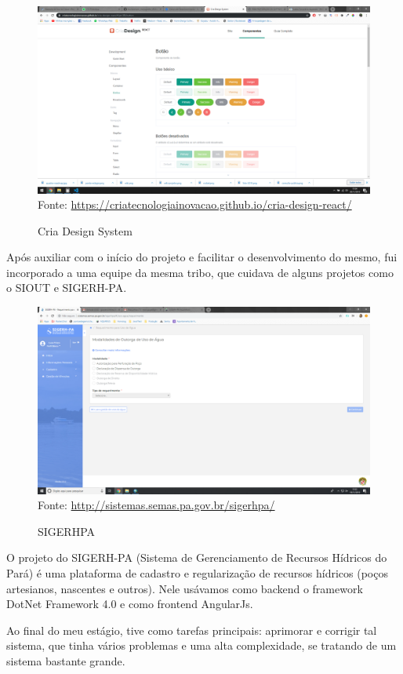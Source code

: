 \begin{figure}[H]
\centering
\caption{Cria Design System} %
\includegraphics[scale=0.3]{cria-design}\\  %
{\small Fonte: \url{https://criatecnologiainovacao.github.io/cria-design-react/}} %
\label{fig:exemplo} %
\end{figure}

Após auxiliar com o início do projeto e facilitar o desenvolvimento do mesmo, fui incorporado a uma equipe da mesma tribo, que cuidava de alguns projetos como o SIOUT e SIGERH-PA.

\begin{figure}[H]
\centering
\caption{SIGERHPA} %
\includegraphics[scale=0.222]{sigerpa}\\  %
{\small Fonte: \url{http://sistemas.semas.pa.gov.br/sigerhpa/}} %
\label{fig:exemplo} %
\end{figure}

O projeto do SIGERH-PA (Sistema de Gerenciamento de Recursos Hídricos do Pará) é uma plataforma de cadastro e regularização de recursos hídricos (poços artesianos, nascentes e outros).
Nele usávamos como backend o framework DotNet Framework 4.0 e como frontend AngularJs.

Ao final do meu estágio, tive como tarefas principais: aprimorar e corrigir tal sistema, que tinha
vários problemas e uma alta complexidade, se tratando de um sistema bastante grande.